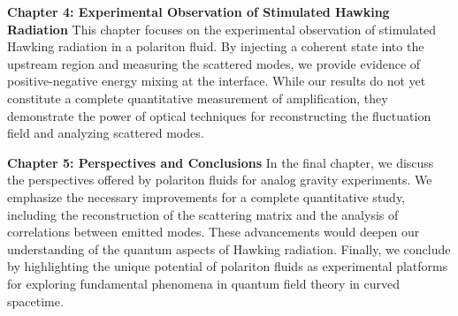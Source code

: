 \textbf{Chapter 4: Experimental Observation of Stimulated Hawking Radiation}  
This chapter focuses on the experimental observation of stimulated Hawking radiation in a polariton fluid. By injecting a coherent state into the upstream region and measuring the scattered modes, we provide evidence of positive-negative energy mixing at the interface. While our results do not yet constitute a complete quantitative measurement of amplification, they demonstrate the power of optical techniques for reconstructing the fluctuation field and analyzing scattered modes.

\textbf{Chapter 5: Perspectives and Conclusions}  
In the final chapter, we discuss the perspectives offered by polariton fluids for analog gravity experiments. We emphasize the necessary improvements for a complete quantitative study, including the reconstruction of the scattering matrix and the analysis of correlations between emitted modes. These advancements would deepen our understanding of the quantum aspects of Hawking radiation. Finally, we conclude by highlighting the unique potential of polariton fluids as experimental platforms for exploring fundamental phenomena in quantum field theory in curved spacetime.